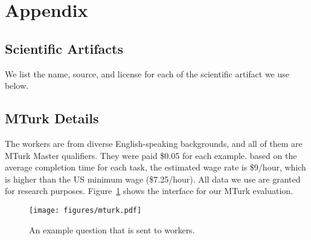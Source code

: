 \section{Appendix}

\subsection{Scientific Artifacts}
\label{sec:copyright}
We list the name, source, and license for each of the scientific artifact we use below.

\begin{table}[h]
    \centering
    \caption{Scientific artifact sources and licenses.}
    \label{tab:dataset_licenses}
\end{table}


\subsection{MTurk Details}
\label{sec:mturk}
The workers are from diverse English-speaking backgrounds, and all of them are MTurk Master qualifiers. They were paid \$0.05 for each example. based on the average completion time for each task, the estimated wage rate is \$9/hour, which is higher than the US minimum wage (\$7.25/hour). All data we use are granted for research purposes. Figure~\ref{fig:MTurk} shows the interface for our MTurk evaluation.

\begin{figure}[h!]
    \centering
    \texttt{[image: figures/mturk.pdf]}
    \caption{An example question that is sent to workers.}
    \label{fig:MTurk}
\end{figure}